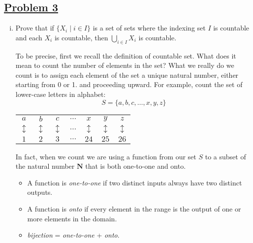 \documentclass[10pt,letterpaper]{article}
\begin{document}
	\subsection*{{\color{purple}\underline{Problem 3}}}
	\text{ }
	\begin{enumerate}[(i)]
\item Prove that if $\{X_i \mid i \in I\}$ is a set of sets where the indexing set $I$ is countable
		and each $X_i$ is countable, then $\displaystyle{\bigcup_{i \in I}}X_i$ is countable.

		To be precise, first we recall the definition of countable set. What does it mean to count 
		the number of elements in the set? What we really do we count is to assign each element of the 
		set a unique natural number, either starting from 0 or 1. and proceeding upward. For example,
		count the set of lower-case letters in alphabet:
		$$S = \{a, b, c, \ldots, x, y, z\}$$
		\begin{center}
		\begin{tabular}{ccccccc}
			$a$ & $b$ & $c$ & $\ldots$ & $x$ & $y$ & $z$ \\
			$\updownarrow$ & $\updownarrow$ & $\updownarrow$ & $\ldots$ & $\updownarrow$ & $\updownarrow$ & $\updownarrow$ \\
			$1$ & $2$ & $3$ & $\ldots$ & $24$ & $25$ & $26$ 
		\end{tabular}
		\end{center}
		In fact, when we count we are using a function from our set $S$ to a subset of the natural number $\mathbf{N}$
		that is both one-to-one and onto. \\
		\begin{itemize}
			\item A function is \emph{one-to-one} if two distinct inputs always have two distinct outputs. 
			\item A function is \emph{onto} if every element in the range is the output of one or more elements
			in the domain.
			\item \emph{bijection} = \emph{one-to-one} + \emph{onto}. 
		\end{itemize}
	

\end{enumerate}
\end{document}
